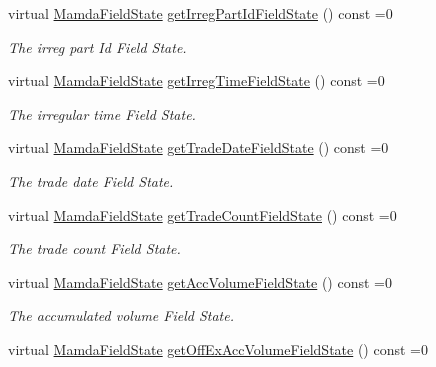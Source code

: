 \begin{CompactItemize}
virtual \hyperlink{namespaceWombat_93aac974f2ab713554fd12a1fa3b7d2a}{Mamda\-Field\-State} \hyperlink{classWombat_1_1MamdaTradeRecap_7279903433d1059bf0fa02ea3af73f2d}{get\-Irreg\-Part\-Id\-Field\-State} () const =0
\begin{CompactList}\small\item\em The irreg part Id Field State. \item\end{CompactList}\item 
virtual \hyperlink{namespaceWombat_93aac974f2ab713554fd12a1fa3b7d2a}{Mamda\-Field\-State} \hyperlink{classWombat_1_1MamdaTradeRecap_edaa9f3db0011e8175309628b7d17f09}{get\-Irreg\-Time\-Field\-State} () const =0
\begin{CompactList}\small\item\em The irregular time Field State. \item\end{CompactList}\item 
virtual \hyperlink{namespaceWombat_93aac974f2ab713554fd12a1fa3b7d2a}{Mamda\-Field\-State} \hyperlink{classWombat_1_1MamdaTradeRecap_825b27f46b43bbe98dacb9377b32e0e3}{get\-Trade\-Date\-Field\-State} () const =0
\begin{CompactList}\small\item\em The trade date Field State. \item\end{CompactList}\item 
virtual \hyperlink{namespaceWombat_93aac974f2ab713554fd12a1fa3b7d2a}{Mamda\-Field\-State} \hyperlink{classWombat_1_1MamdaTradeRecap_6de11a97ec493b1e7fd9c843406127bc}{get\-Trade\-Count\-Field\-State} () const =0
\begin{CompactList}\small\item\em The trade count Field State. \item\end{CompactList}\item 
virtual \hyperlink{namespaceWombat_93aac974f2ab713554fd12a1fa3b7d2a}{Mamda\-Field\-State} \hyperlink{classWombat_1_1MamdaTradeRecap_ee7ddb433c0825515166da7226852b4b}{get\-Acc\-Volume\-Field\-State} () const =0
\begin{CompactList}\small\item\em The accumulated volume Field State. \item\end{CompactList}\item 
virtual \hyperlink{namespaceWombat_93aac974f2ab713554fd12a1fa3b7d2a}{Mamda\-Field\-State} \hyperlink{classWombat_1_1MamdaTradeRecap_84fad7757aecfad7c39e563709091c46}{get\-Off\-Ex\-Acc\-Volume\-Field\-State} () const =0

\end{CompactItemize}
